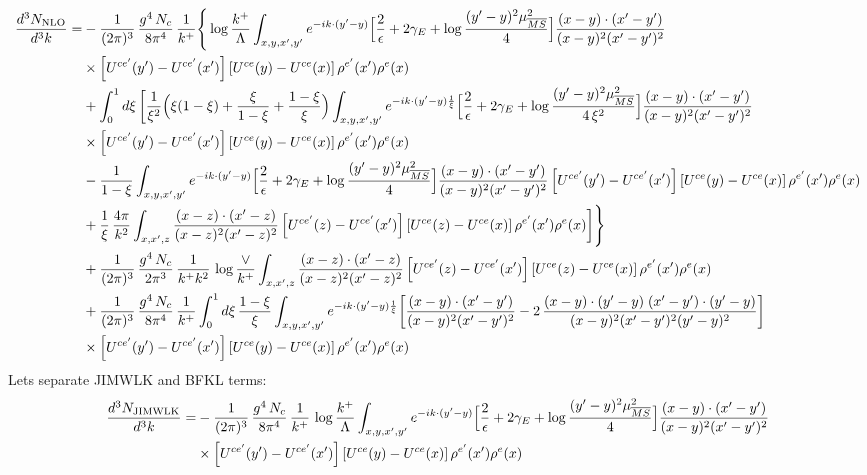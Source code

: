 \documentclass[9pt]{article}
\numberwithin{equation}{section}
\begin{document}
\begin{align}
\frac{d^{3}N_{\rm NLO}}{d^{3}k}= &-\frac{1}{(2\pi)^{3}}\,\frac{g^{4}\,N_{c}}{8\pi^{4}}\,\frac{1}{k^{+}}\Bigg\{\log\frac{k^{+}}{\Lambda}\int_{x,y,x',y'}e^{-ik\cdot(y'-y)}\Big[\frac{2}{\epsilon}+2\gamma_{E}+\log\frac{(y'-y)^{2}\mu^{2}_{\overline{MS}}}{4}\Big]\frac{(x-y)\cdot(x'-y')}{(x-y)^{2}(x'-y')^{2}}\notag\\
&\times\left[U^{ce'}(y') - U^{ce'}(x')\right]\left[U^{ce}(y) - U^{ce}(x)\right]\rho^{e'}(x')\rho^{e}(x)\notag\\
&+\int_{0}^{1}d\xi\,\bigg[\frac{1}{\xi^{2}}\Big(\xi(1-\xi)+\frac{\xi}{1-\xi}+\frac{1-\xi}{\xi}\Big)\int_{x,y,x',y'}e^{-ik\cdot(y'-y)\frac{1}{\xi}}\Big[\frac{2}{\epsilon}+2\gamma_{E}+\log\frac{(y'-y)^{2}\mu^{2}_{\overline{MS}}}{4\,\xi^{2}}\Big]\frac{(x-y)\cdot(x'-y')}{(x-y)^{2}(x'-y')^{2}}\notag\\
&\times\left[U^{ce'}(y') - U^{ce'}(x')\right]\left[U^{ce}(y) - U^{ce}(x)\right]\rho^{e'}(x')\rho^{e}(x)\notag\\
&-\frac{1}{1-\xi}\int_{x,y,x',y'}e^{-ik\cdot(y'-y)}\Big[\frac{2}{\epsilon}+2\gamma_{E}+\log\frac{(y'-y)^{2}\mu^{2}_{\overline{MS}}}{4}\Big]\frac{(x-y)\cdot(x'-y')}{(x-y)^{2}(x'-y')^{2}}\left[U^{ce'}(y') - U^{ce'}(x')\right]\left[U^{ce}(y) - U^{ce}(x)\right]\rho^{e'}(x')\rho^{e}(x)\notag\\
&+\frac{1}{\xi}\,\frac{4\pi}{k^{2}}\int_{x,x',z}\frac{(x-z)\cdot(x'-z)}{(x-z)^{2}(x'-z)^{2}}\left[U^{ce'}(z) - U^{ce'}(x')\right]\left[U^{ce}(z) - U^{ce}(x)\right]\rho^{e'}(x')\rho^{e}(x)\bigg]\Bigg\}\notag\\
&+\frac{1}{(2\pi)^{3}}\,\frac{g^{4}\,N_{c}}{2\pi^{3}}\,\frac{1}{k^{+}k^{2}}\,\log\frac{\vee}{k^{+}}\int_{x,x',z}\frac{(x-z)\cdot(x'-z)}{(x-z)^{2}(x'-z)^{2}}\left[U^{ce'}(z) - U^{ce'}(x')\right]\left[U^{ce}(z) - U^{ce}(x)\right]\rho^{e'}(x')\rho^{e}(x)\notag\\
&+\frac{1}{(2\pi)^{3}}\,\frac{g^{4}\,N_{c}}{8\pi^{4}}\,\frac{1}{k^{+}}\int_{0}^{1}d\xi\,\frac{1-\xi}{\xi}\int_{x,y,x',y'}e^{-ik\cdot(y'-y)\frac{1}{\xi}}\bigg[\frac{(x-y)\cdot(x'-y')}{(x-y)^{2}(x'-y')^{2}}-2\,\frac{(x-y)\cdot(y'-y)\;(x'-y')\cdot(y'-y)}{(x-y)^{2}(x'-y')^{2}(y'-y)^{2}}\bigg]\notag\\
&\times\left[U^{ce'}(y') - U^{ce'}(x')\right]\left[U^{ce}(y) - U^{ce}(x)\right]\rho^{e'}(x')\rho^{e}(x)
\end{align}
Lets separate JIMWLK and BFKL terms:
\begin{align}
\frac{d^{3}N_{\rm JIMWLK}}{d^{3}k}= &-\frac{1}{(2\pi)^{3}}\,\frac{g^{4}\,N_{c}}{8\pi^{4}}\,\frac{1}{k^{+}}\,\log\frac{k^{+}}{\Lambda}\int_{x,y,x',y'}e^{-ik\cdot(y'-y)}\Big[\frac{2}{\epsilon}+2\gamma_{E}+\log\frac{(y'-y)^{2}\mu^{2}_{\overline{MS}}}{4}\Big]\frac{(x-y)\cdot(x'-y')}{(x-y)^{2}(x'-y')^{2}}\notag\\
&\times\left[U^{ce'}(y') - U^{ce'}(x')\right]\left[U^{ce}(y) - U^{ce}(x)\right]\rho^{e'}(x')\rho^{e}(x)
\end{align}
\end{document}
